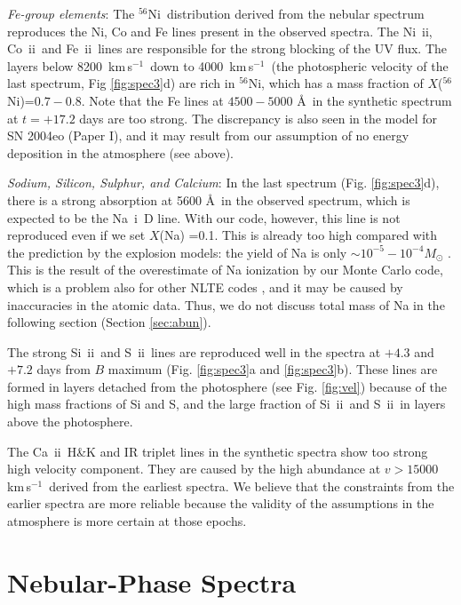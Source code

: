 \documentclass[usegraphicx,usenatbib]{mn2e}
\newcommand{\kms}{\mbox{\,km\,s$^{-1}$}}
\newcommand{\eg}{e.g.,\ }
\newcommand{\Msun}{M_{\odot}}
\newcommand{\NaI}{Na~{\sc i}}
\newcommand{\SiII}{Si~{\sc ii}}
\newcommand{\SII}{S~{\sc ii}}
\newcommand{\CaII}{Ca~{\sc ii}}
\newcommand{\FeII}{Fe~{\sc ii}}
\newcommand{\CoII}{Co~{\sc ii}}
\newcommand{\NiII}{Ni~{\sc ii}}
\newcommand{\Nifs}{$^{56}$Ni}
\begin{document}
{\it Fe-group elements}: The \Nifs\ distribution derived from the nebular
spectrum reproduces the Ni, Co and Fe lines present in the observed spectra. 
The \NiII, \CoII\ and \FeII\ lines are responsible for the strong blocking of
the UV flux. The layers below 8200 \kms\ down to 4000 \kms\ (the photospheric
velocity  of the last spectrum, Fig \ref{fig:spec3}d) are rich in \Nifs, which
has a mass fraction of $X$(\Nifs)=$0.7-0.8$. Note that the Fe lines at 
$4500-5000$ \AA\ in the synthetic spectrum at $t=+17.2$ days are too strong. The discrepancy
is also seen in the model for SN 2004eo (Paper I), and it may result from our
assumption of no energy deposition in the atmosphere (see above).

{\it Sodium, Silicon, Sulphur, and Calcium}: In the last spectrum
(Fig. \ref{fig:spec3}d), there is a
strong absorption at 5600 \AA\ in the observed spectrum, which is expected to be
the \NaI\ D line. With our code, however, this line is not reproduced even if we
set $X$(Na) =0.1. This is already too high compared with the prediction by the
explosion models: the yield of Na is only $\sim 10^{-5} - 10^{-4} \Msun$
\citep[\eg][]{iwamoto99}.  This is the result of the overestimate of Na
ionization by our Monte Carlo code, which is a problem also for other NLTE codes
\citep[][and references therein]{mazzali97}, and it may be caused by
inaccuracies in the atomic data. Thus, we do not discuss total mass of Na in the
following section  (Section \ref{sec:abun}).

The strong \SiII\ and \SII\ lines are reproduced well in the spectra at $+4.3$
and $+7.2$ days from $B$ maximum (Fig. \ref{fig:spec3}a and \ref{fig:spec3}b).
These lines are formed in layers detached from the photosphere (see Fig.
\ref{fig:vel}) because of the high mass fractions of Si and S, and the
large fraction of \SiII\ and \SII\ in layers above the photosphere.

The \CaII\ H\&K and IR triplet lines in the synthetic spectra show too strong
high velocity component. They are caused by the high abundance at $v > 15000$
\kms\ derived from the earliest spectra. We believe that the constraints from
the earlier spectra are more reliable because the validity of the assumptions 
in the atmosphere is more certain at those epochs.


\section{Nebular-Phase Spectra}
\label{sec:late}
\end{document}
